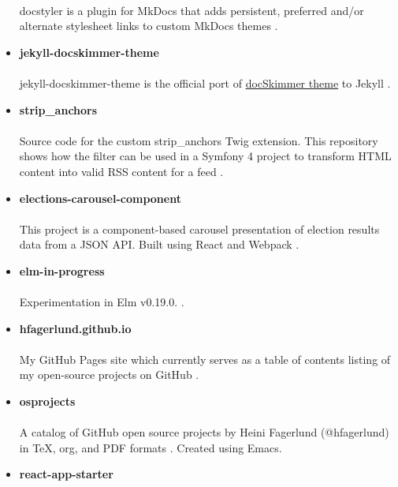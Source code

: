 \documentclass[11pt]{article}
\begin{document}
\begin{itemize}
\paragraph{}
docstyler is a plugin for MkDocs that adds persistent, preferred
and/or alternate stylesheet links to custom MkDocs themes \cite{mkdocs-docstyler-plugin}.
\item \textbf{jekyll-docskimmer-theme}
 \paragraph{}
jekyll-docskimmer-theme is the official port of \href{https://github.com/hfagerlund/mkdocs-docskimmer}{docSkimmer theme} to Jekyll \cite{jekyll-docskimmer}.
\item \textbf{strip\_anchors}
\paragraph{}
Source code for the custom strip\_anchors Twig extension. This repository shows how the filter can be used in a Symfony 4 project to transform HTML content into valid RSS content for a feed \cite{stripanchors}.
\item \textbf{elections-carousel-component}
\paragraph{}
This project is a component-based carousel presentation of election results data from a JSON API. Built using React and Webpack \cite{elections-carousel-component}.
\item \textbf{elm-in-progress}
\paragraph{}
Experimentation in Elm v0.19.0.
 \cite{elm}.
\item \textbf{hfagerlund.github.io}
\paragraph{}
My GitHub Pages site which currently serves as a table of contents listing of my open-source projects on GitHub \cite{ghpages}.
\item \textbf{osprojects}
\paragraph{}
A catalog of GitHub open source projects by Heini Fagerlund (@hfagerlund) in \TeX{}, org, and PDF formats \cite{osprojects}. Created using Emacs.
\item \textbf{react-app-starter}

\end{itemize}
\end{document}
